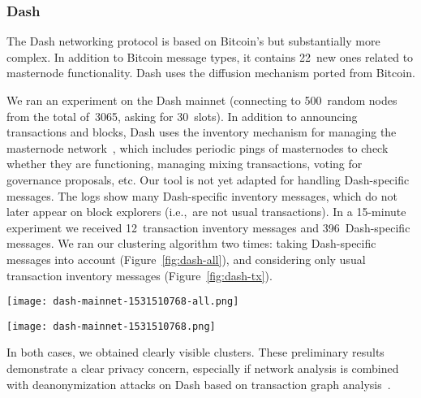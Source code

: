 \subsubsection{Dash}

The Dash networking protocol is based on Bitcoin's but substantially more complex.
In addition to Bitcoin message types, it contains 22~new ones related to masternode functionality.
Dash uses the diffusion mechanism ported from Bitcoin.

We ran an experiment on the Dash mainnet (connecting to 500~random nodes from the total of~3065, asking for 30~slots).
In addition to announcing transactions and blocks, Dash uses the inventory mechanism for managing the masternode network~\cite{Schinzel2015}, which includes periodic pings of masternodes to check whether they are functioning, managing mixing transactions, voting for governance proposals, etc.
Our tool is not yet adapted for handling Dash-specific messages.
The logs show many Dash-specific inventory messages, which do not later appear on block explorers (i.e.,~are not usual transactions).
In a 15-minute experiment we received  12~transaction inventory messages and 396~Dash-specific messages.
We ran our clustering algorithm two times: taking Dash-specific messages into account (Figure~\ref{fig:dash-all}), and considering only usual transaction inventory messages (Figure~\ref{fig:dash-tx}).


\begin{figure*}
	\centering
	\begin{minipage}{0.5\textwidth}
		\centering
		\texttt{[image: dash-mainnet-1531510768-all.png]}
		\caption{Dash (Dash-specific messages and usual transactions)}
	\end{minipage}\hfill
	\begin{minipage}{0.5\textwidth}
		\centering
		\texttt{[image: dash-mainnet-1531510768.png]}
		\caption{Dash (usual transactions)}
	\end{minipage}\hfill
	\label{fig:dash-all}
\end{figure*}


In both cases, we obtained clearly visible clusters.
These preliminary results demonstrate a clear privacy concern, especially if network analysis is combined with deanonymization attacks on Dash based on transaction graph analysis~\cite{Kalodner2017}. 


